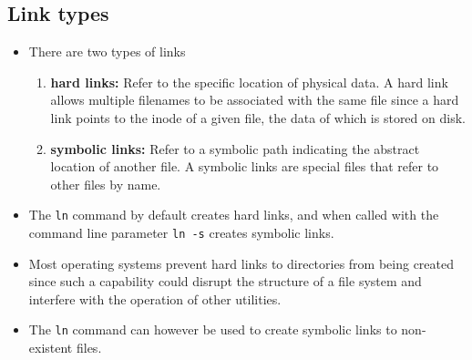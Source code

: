 \subsection{Link types}
\begin{itemize}
\item There are two types of links
\begin{enumerate}
\item  \textbf{hard links:} Refer to the specific location of physical data.
A hard link allows multiple filenames to be associated with the same file since a hard link points to the 
inode of a given file, the data of which is stored on disk.
\item  \textbf{symbolic links:} Refer to a symbolic path indicating the abstract location of another file.
A symbolic links are special files that refer to other files by name.
\end{enumerate}
\item The \verb+ln+ command by default creates hard links, and when called with the command line parameter \verb+ln -s+
creates symbolic links.
\item Most operating systems prevent hard links to directories from being created since such a capability could disrupt
the structure of a file system and interfere with the operation of other utilities. 
\item The \verb+ln+ command can however be used to create symbolic links to  non-existent files. 
\end{itemize}

